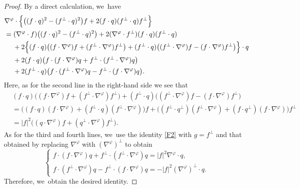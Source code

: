 \documentclass[10pt]{amsart}
\theoremstyle{definition}
\begin{document}
\begin{proof}
By a direct calculation, we~have
\begin{align*}
& \nabla^\varphi\cdot\Bigl\{ \bigl((f\cdot q)^2-(f^\perp\cdot q)^2 \bigr)f + 2(f\cdot q)(f^\perp\cdot q)f^\perp \Bigr\} \\
&= (\nabla^\varphi\cdot f)\bigl((f\cdot q)^2-(f^\perp\cdot q)^2 \bigr) + 2(\nabla^\varphi\cdot f^\perp)(f\cdot q)(f^\perp\cdot q) \\
&\quad\;
+ 2\Bigl\{ (f\cdot q)\bigl((f\cdot\nabla^\varphi)f + (f^\perp\cdot\nabla^\varphi)f^\perp \bigr)
+ (f^\perp\cdot q)\bigl((f^\perp\cdot\nabla^\varphi)f - (f\cdot\nabla^\varphi)f^\perp \bigr) \Bigr\}\cdot q \\
&\quad\;
+ 2(f\cdot q)\bigl(f\cdot(f\cdot\nabla^\varphi)q + f^\perp\cdot(f^\perp\cdot\nabla^\varphi)q \bigr)\\
&\quad\;
+ 2(f^\perp\cdot q)\bigl(f\cdot(f^\perp\cdot\nabla^\varphi)q - f^\perp\cdot(f\cdot\nabla^\varphi)q \bigr).
\end{align*}
Here, as for the second line in the right-hand side we see that
\begin{align*}
& (f\cdot q)\bigl((f\cdot\nabla^\varphi)f + (f^\perp\cdot\nabla^\varphi)f^\perp \bigr)
+ (f^\perp\cdot q)\bigl((f^\perp\cdot\nabla^\varphi)f - (f\cdot\nabla^\varphi)f^\perp \bigr) \\
&= \bigl((f\cdot q)(f\cdot\nabla^\varphi) + (f^\perp\!\cdot q)(f^\perp\cdot\nabla^\varphi) \bigr)f
+ \bigl((f^\perp\cdot q^\perp)(f^\perp\cdot\nabla^\varphi) + (f\cdot q^\perp)(f\cdot\nabla^\varphi) \bigr)f^\perp \\
&= |f|^2 \bigl((q\cdot\nabla^\varphi)f + (q^\perp\cdot\nabla^\varphi)f^\perp \bigr).
\end{align*}
As for the third and fourth lines, we~use the identity \eqref{F2} with $g=f^\perp$ and that obtained by replacing $\nabla^\varphi$ with $(\nabla^\varphi)^\perp$ to obtain
\[
\begin{cases}
f\cdot(f\cdot\nabla^\varphi)q + f^\perp\cdot(f^\perp\cdot\nabla^\varphi)q = |f|^2\nabla^\varphi\cdot q, \\
f\cdot(f^\perp\cdot\nabla^\varphi)q - f^\perp\cdot(f\cdot\nabla^\varphi)q = -|f|^2(\nabla^\varphi)^\perp\cdot q.
\end{cases}
\]
Therefore, we~obtain the desired identity.
\end{proof}
\end{document}
